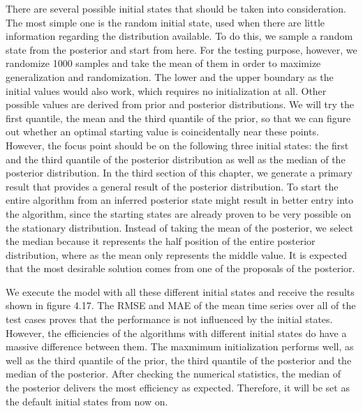 There are several possible initial states that should be taken into consideration. The most simple one is the random initial state, used when there are little information regarding the distribution available. To do this, we sample a random state from the posterior and start from here. For the testing purpose, however, we randomize 1000 samples and take the mean of them in order to maximize generalization and randomization. The lower and the upper boundary as the initial values would also work, which requires no initialization at all. Other possible values are derived from prior and posterior distributions. We will try the first quantile, the mean and the third quantile of the prior, so that we can figure out whether an optimal starting value is coincidentally near these points. However, the focus point should be on the following three initial states: the first and the third quantile of the posterior distribution as well as the median of the posterior distribution. In the third section of this chapter, we generate a primary result that provides a general result of the posterior distribution. To start the entire algorithm from an inferred posterior state might result in better entry into the algorithm, since the starting states are already proven to be very possible on the stationary distribution. Instead of taking the mean of the posterior, we select the median because it represents the half position of the entire posterior distribution, where as the mean only represents the middle value. It is expected that the most desirable solution comes from one of the proposals of the posterior.

We execute the model with all these different initial states and receive the results shown in figure 4.17. The RMSE and MAE of the mean time series over all of the test cases proves that the performance is not influenced by the initial states. However, the efficiencies of the algorithms with different initial states do have a massive difference between them. The maxmimum initialization performs well, as well as the third quantile of the prior, the third quantile of the posterior and the median of the posterior. After checking the numerical statistics, the median of the posterior delivers the most efficiency as expected. Therefore, it will be set as the default initial states from now on.

